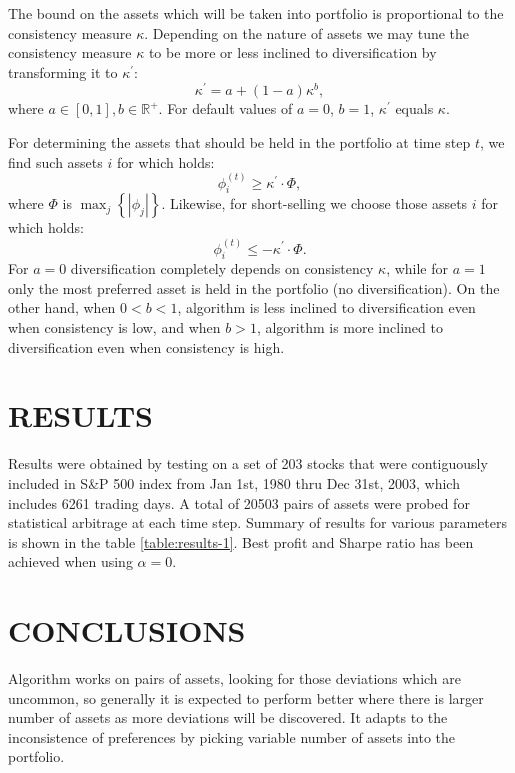 \documentclass[letterpaper, 10pt, conference]{ieeeconf}
\begin{document}
  The bound on the assets which will be taken into portfolio is proportional to the consistency measure $\kappa$.
  Depending on the nature of assets we may tune the consistency measure $\kappa$ to be more or less inclined to diversification by transforming it to $\kappa^\prime$:
  \begin{equation}
    \kappa^\prime = a + (1 - a)\kappa^b,
  \end{equation}
  where $a \in [0, 1], b \in \mathbb{R}^+$.
  For default values of $a = 0$, $b = 1$, $\kappa^\prime$ equals $\kappa$.
  
  For determining the assets that should be held in the portfolio at time step $t$, we find such assets $i$ for which holds:
  \begin{equation}
    \phi_i^{(t)} \ge \kappa^\prime \cdot \Phi,
  \end{equation}
  where $\Phi$ is $\max_j \left\{ \left| \phi_j \right| \right\}$.
  Likewise, for short-selling we choose those assets $i$ for which holds:
  \begin{equation}
    \phi_i^{(t)} \le -\kappa^\prime \cdot \Phi.
  \end{equation}
  For $a = 0$ diversification completely depends on consistency $\kappa$, while for $a = 1$ only the most preferred asset is held in the portfolio (no diversification).
  On the other hand, when $0 < b < 1$, algorithm is less inclined to diversification even when consistency is low, and when $b > 1$, algorithm is more inclined to diversification even when consistency is high. 
  
  \section{RESULTS}
  
  Results were obtained by testing on a set of 203 stocks that were contiguously included in S\&P 500 index from Jan 1st, 1980 thru Dec 31st, 2003, which includes 6261 trading days.
  A total of 20503 pairs of assets were probed for statistical arbitrage at each time step.
  Summary of results for various parameters is shown in the table \ref{table:results-1}.
  Best profit and Sharpe ratio has been achieved when using $\alpha = 0$.
  
  
  \section{CONCLUSIONS}
  
  Algorithm works on pairs of assets, looking for those deviations which are uncommon, so generally it is expected to perform better where there is larger number of assets as more deviations will be discovered.
  It adapts to the inconsistence of preferences by picking variable number of assets into the portfolio.
    
\end{document}
